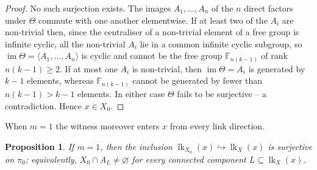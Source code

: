\documentclass[reqno]{amsart}
\newtheorem{proposition}[theorem]{Proposition}
\theoremstyle{definition}
\newcommand{\im}{\operatorname{im}}
\DeclareMathOperator{\lk}{lk}
\numberwithin{equation}{section}
\begin{document}
\begin{proof}
No such surjection exists. The images \(A_1,\dots,A_n\) of the \(n\)
direct factors under \(\Theta\) commute with one another
elementwise. If at least two of the \(A_i\) are non-trivial then,
since the centraliser of a non-trivial element of a free group is
infinite cyclic, all the non-trivial \(A_i\) lie in a common
infinite cyclic subgroup, so
\(\im\Theta=\langle A_1,\dots,A_n\rangle\) is cyclic and cannot be
the free group \(\mathbb{F}_{n(k-1)}\) of rank \(n(k-1)\ge2\). If at
most one \(A_i\) is non-trivial, then \(\im\Theta=A_i\) is generated
by \(k-1\) elements, whereas \(\mathbb{F}_{n(k-1)}\) cannot be
generated by fewer than \(n(k-1)>k-1\) elements. In either case
\(\Theta\) fails to be surjective -- a contradiction. Hence
\(x\in X_0\).
\end{proof}

When \(m=1\) the witness moreover enters \(x\) from every link
direction.

\begin{proposition}\label{prop:X0-meets-link-m1}
If \(m=1\), then the inclusion
\(\lk_{X_0}(x)\hookrightarrow\lk_X(x)\) is surjective on \(\pi_0\);
equivalently, \(X_0\cap A_L\neq\varnothing\) for every connected
component \(L\subseteq\lk_X(x)\).
\end{proposition}
\end{document}
